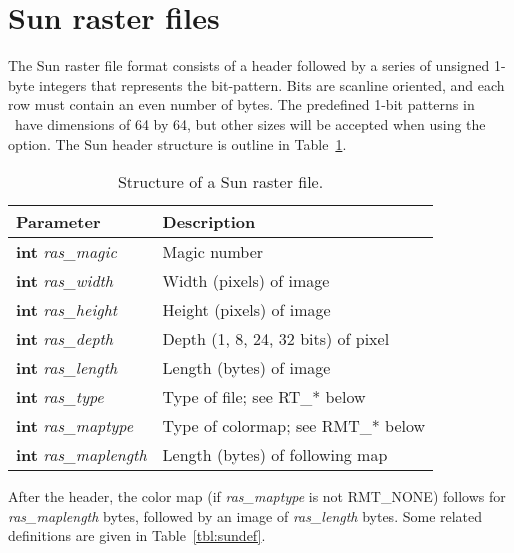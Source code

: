 \section{Sun raster files}

The Sun raster file format consists of a header followed by a series
of unsigned 1-byte integers that represents the bit-pattern.  Bits
are scanline oriented, and each row must contain an even number of
bytes.  The predefined 1-bit
patterns in \GMT\ have dimensions of 64 by 64, but other sizes will be
accepted when using the  option.  The Sun header structure
is outline in Table~\ref{tbl:sunheader}.

\begin{table}[H]
\centering

\begin{tabular}{ll} \hline
\textbf{Parameter} & \textbf{Description} \\ \hline\hline
\textbf{int} \emph{ras\_magic} & Magic number \\
\textbf{int} \emph{ras\_width} & Width (pixels) of image \\
\textbf{int} \emph{ras\_height} & Height (pixels) of image \\
\textbf{int} \emph{ras\_depth} & Depth (1, 8, 24, 32 bits) of pixel \\
\textbf{int} \emph{ras\_length} & Length (bytes) of image \\
\textbf{int} \emph{ras\_type} & Type of file; see RT\_* below \\
\textbf{int} \emph{ras\_maptype} & Type of colormap; see RMT\_* below \\
\textbf{int} \emph{ras\_maplength} & Length (bytes) of following map \\\hline
\end{tabular}

\caption{Structure of a Sun raster file.}
\label{tbl:sunheader}
\end{table}

After the header, the color map (if \emph{ras\_maptype} is not RMT\_NONE)
follows for \emph{ras\_maplength} bytes, followed by an image of
\emph{ras\_length} bytes.  Some related definitions are given in Table~\ref{tbl:sundef}.

